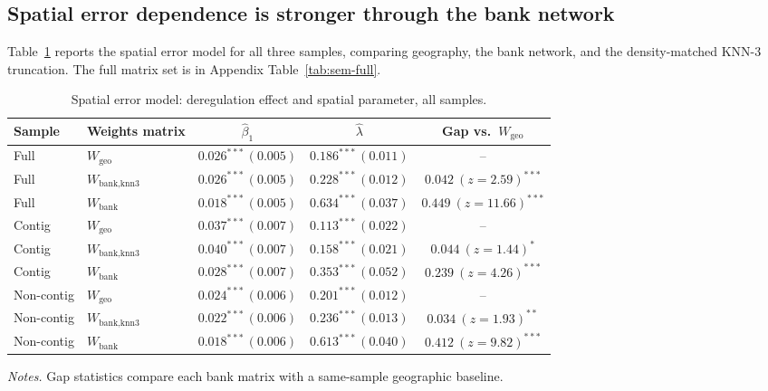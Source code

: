 \subsection{Spatial error dependence is stronger through the bank network}
\label{sec:sem-results}

Table~\ref{tab:sem-main} reports the spatial error model for all three samples,
comparing geography, the bank network, and the density-matched KNN-3 truncation.
The full matrix set is in Appendix Table~\ref{tab:sem-full}.

\begin{table}[htbp]
  \centering
  \caption{Spatial error model: deregulation effect and spatial parameter, all samples.}
  \label{tab:sem-main}
  \begin{tabular}{llccc}
    \toprule
    Sample & Weights matrix & $\hat\beta_1$ & $\hat\lambda$ & Gap vs.\ $W_{\text{geo}}$ \\
    \midrule
    Full & $W_{\text{geo}}$ & $0.026^{***}\,(0.005)$ & $0.186^{***}\,(0.011)$ & -- \\
    Full & $W_{\text{bank,knn3}}$ & $0.026^{***}\,(0.005)$ & $0.228^{***}\,(0.012)$ & $0.042\ (z{=}2.59)^{***}$ \\
    Full & $W_{\text{bank}}$ & $0.018^{***}\,(0.005)$ & $0.634^{***}\,(0.037)$ & $0.449\ (z{=}11.66)^{***}$ \\
    \addlinespace
    Contig & $W_{\text{geo}}$ & $0.037^{***}\,(0.007)$ & $0.113^{***}\,(0.022)$ & -- \\
    Contig & $W_{\text{bank,knn3}}$ & $0.040^{***}\,(0.007)$ & $0.158^{***}\,(0.021)$ & $0.044\ (z{=}1.44)^{*}$ \\
    Contig & $W_{\text{bank}}$ & $0.028^{***}\,(0.007)$ & $0.353^{***}\,(0.052)$ & $0.239\ (z{=}4.26)^{***}$ \\
    \addlinespace
    Non-contig & $W_{\text{geo}}$ & $0.024^{***}\,(0.006)$ & $0.201^{***}\,(0.012)$ & -- \\
    Non-contig & $W_{\text{bank,knn3}}$ & $0.022^{***}\,(0.006)$ & $0.236^{***}\,(0.013)$ & $0.034\ (z{=}1.93)^{**}$ \\
    Non-contig & $W_{\text{bank}}$ & $0.018^{***}\,(0.006)$ & $0.613^{***}\,(0.040)$ & $0.412\ (z{=}9.82)^{***}$ \\
    \bottomrule
  \end{tabular}
  \begin{tablenotes}\footnotesize
  \item \emph{Notes.} Gap statistics compare each bank matrix with a same-sample geographic baseline.
  \end{tablenotes}
\end{table}

